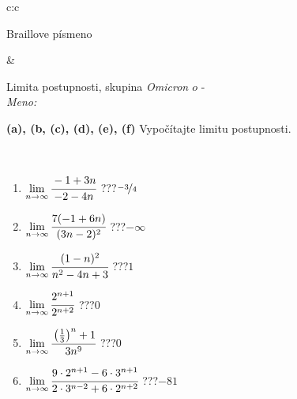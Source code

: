 \documentclass[10pt]{report}
\newcommand\omicron{o}
\begin{document}
\begin{tabular}{c:c}
\begin{minipage}[c][104.5mm][t]{0.5\linewidth}
\begin{center}
\begin{minipage}{0.20\linewidth}
\begin{center}
{\small Braillove písmeno}
\end{center}
\end{minipage}
\end{center}
\end{minipage}
&
\begin{minipage}[c][104.5mm][t]{0.5\linewidth}
\begin{center}
\vspace{5mm}
{\huge Limita postupnosti, skupina \textit{Omicron $\omicron$} -}\\[5mm]
\textit{Meno:}\phantom{xxxxxxxxxxxxxxxxxxxxxxxxxxxxxxxxxxxxxxxxxxxxxxxxxxxxxxxxxxxxxxxxx}\\[5mm]
\begin{minipage}{0.95\linewidth}
\begin{center}
{
\textbf{(a), (b, (c), (d), (e), (f)} Vypočítajte limitu postupnosti. \\[-1mm]
\phantom{x}
}
\end{center}
\end{minipage}
\\[1mm]
\begin{minipage}{0.79\linewidth}
\begin{center}
\begin{varwidth}{\linewidth}
\setlength{\itemsep}{0pt}
\begin{enumerate}
\normalsize
\item $\lim\limits_{n\to\infty}\cfrac{-1+3n}{-2-4n}$\quad \dotfill\; ???\;\dotfill \quad $\nicefrac{-3}{4}$
\item $\lim\limits_{n\to\infty}\cfrac{7(-1+6n)}{(3n-2)^2}$\quad \dotfill\; ???\;\dotfill \quad $-\infty$
\item $\lim\limits_{n\to\infty}\cfrac{(1-n)^2}{n^2-4n+3}$\quad \dotfill\; ???\;\dotfill \quad $1$
\item $\lim\limits_{n\to\infty}\cfrac{2^{n+1}}{2^{n+2}}$\quad \dotfill\; ???\;\dotfill \quad $0$
\item $\lim\limits_{n\to\infty}\cfrac{\left(\frac{1}{3}\right)^n +1}{3n^{9}}$\quad \dotfill\; ???\;\dotfill \quad $0$
\item $\lim\limits_{n\to\infty}\cfrac{9\cdot 2^{n+1}-6\cdot 3^{n+1}}{2\cdot 3^{n-2}+6\cdot 2^{n+2}}$\quad \dotfill\; ???\;\dotfill \quad $-81$
\end{enumerate}
\end{varwidth}
\end{center}
\end{minipage}
\begin{minipage}{0.20\linewidth}

\end{minipage}
\end{center}
\end{minipage}
\end{tabular}
\end{document}
